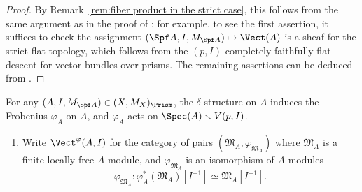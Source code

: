 \begin{proof}
By Remark~\ref{rem:fiber product in the strict case}, this follows from the same argument as in the proof of \cite[Prop.~2.7]{bhatt-scholze-prismaticFcrystal}:
for example, to see the first assertion, it suffices to check the assignment $(\Spf A,I,M_{\Spf A})\mapsto \Vect(A)$ is a sheaf for the strict flat topology, which follows from the $(p,I)$-completely faithfully flat descent for vector bundles over prisms.
The remaining assertions can be deduced from \cite[Thm.~5.8]{mathew-descent}.
\end{proof}


For any $(A,I,M_{\Spf A}) \in (X,M_X)_\Prism$, the $\delta$-structure on $A$ induces the Frobenius $\varphi_A$ on $A$, and $\varphi_A$ acts on $\Spec(A)\smallsetminus V(p,I)$.


\begin{defn}\label{defn:analytic F crystal}\hfill
\begin{enumerate}
    \item Write $\Vect^{\varphi}(A,I)$ for the category of pairs $(\mathfrak{M}_A,\varphi_{\mathfrak{M}_A})$ where $\mathfrak{M}_A$ is a finite locally free $A$-module, and $\varphi_{\mathfrak{M}_A}$ is an isomorphism of $A$-modules
\[
    \varphi_{\mathfrak{M}_A}\colon \varphi_A^\ast(\mathfrak{M}_A)[I^{-1}] \simeq \mathfrak{M}_A[I^{-1}].
\]


\end{enumerate}
\end{defn}
